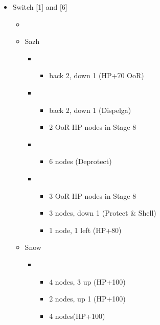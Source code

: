 \begin{menu}
	\begin{itemize}
	\item Switch [1] and [6]
	\paradigm
		\begin{itemize}
			\item {}%
				{\paradigmline{\com}{\com}{\med}}%
				{\paradigmline{\com}{\sen}{\sab}}%
				{\paradigmline{\syn}{\sen}{(\sab)}}%
				{\paradigmline[4]{\com}{\com}{\sab}}%
				{\paradigmline{\rav}{(\sen)}{(\rav)}}%
				{\paradigmline{(\rav)}{\rav}{(\rav)}}%
		\end{itemize}
	\crystarium
		\begin{itemize}
			\item Sazh
				\begin{itemize}
					\item \com
						\begin{itemize}
							\item back 2, down 1 (HP+70 OoR)
						\end{itemize}
					\item \rav
						\begin{itemize}
							\item back 2, down 1 (Dispelga)
							\item 2 OoR HP nodes in Stage 8
						\end{itemize}
					\item \sab
						\begin{itemize}
							\item 6 nodes (Deprotect)
						\end{itemize}
					\item \syn
						\begin{itemize}
							\item 3 OoR HP nodes in Stage 8
							\item 3 nodes, down 1 (Protect \& Shell)
							\item 1 node, 1 left (HP+80)
						\end{itemize}
				\end{itemize}
			\item Snow
				\begin{itemize}
					\item \sen
						\begin{itemize}
							\item 4 nodes, 3 up (HP+100)
							\item 2 nodes, up 1 (HP+100)
							\item 4 nodes(HP+100)

\end{itemize}
\end{itemize}
\end{itemize}
\end{itemize}
\end{menu}
